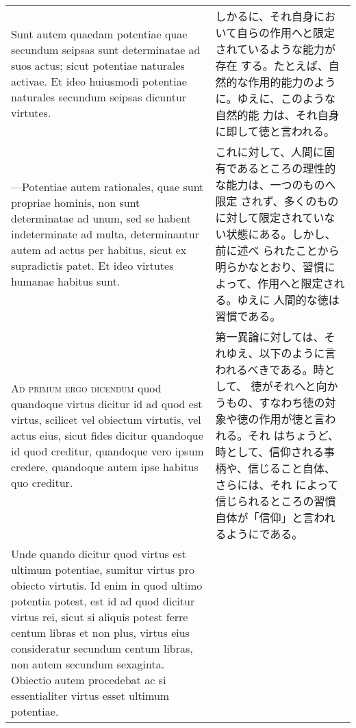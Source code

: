 \documentclass[10pt]{jsarticle}
\begin{document}
\begin{longtable}{p{21em}p{21em}}
\\



Sunt autem quaedam potentiae quae secundum seipsas sunt determinatae
ad suos actus; sicut potentiae naturales activae. Et ideo huiusmodi
potentiae naturales secundum seipsas dicuntur virtutes.


&

しかるに、それ自身において自らの作用へと限定されているような能力が存在
する。たとえば、自然的な作用的能力のように。ゆえに、このような自然的能
力は、それ自身に即して徳と言われる。

\\

---Potentiae autem rationales, quae sunt propriae hominis, non sunt
   determinatae ad unum, sed se habent indeterminate ad multa,
   determinantur autem ad actus per habitus, sicut ex supradictis
   patet. Et ideo virtutes humanae habitus sunt.

&

これに対して、人間に固有であるところの理性的な能力は、一つのものへ限定
されず、多くのものに対して限定されていない状態にある。しかし、前に述べ
られたことから明らかなとおり、習慣によって、作用へと限定される。ゆえに
人間的な徳は習慣である。


\\


{\scshape Ad primum ergo dicendum} quod quandoque virtus dicitur id ad
quod est virtus, scilicet vel obiectum virtutis, vel actus eius, sicut
fides dicitur quandoque id quod creditur, quandoque vero ipsum
credere, quandoque autem ipse habitus quo creditur.


&

第一異論に対しては、それゆえ、以下のように言われるべきである。時として、
徳がそれへと向かうもの、すなわち徳の対象や徳の作用が徳と言われる。それ
はちょうど、時として、信仰される事柄や、信じること自体、さらには、それ
によって信じられるところの習慣自体が「信仰」と言われるようにである。

\\

Unde quando dicitur quod virtus est ultimum potentiae, sumitur virtus
pro obiecto virtutis. Id enim in quod ultimo potentia potest, est id
ad quod dicitur virtus rei, sicut si aliquis potest ferre centum
libras et non plus, virtus eius consideratur secundum centum libras,
non autem secundum sexaginta. Obiectio autem procedebat ac si
essentialiter virtus esset ultimum potentiae.

&


\end{longtable}
\end{document}
